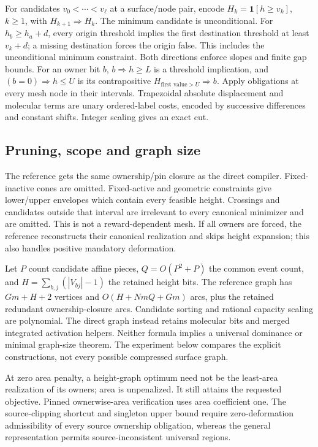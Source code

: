 \documentclass[10pt,letterpaper]{article}
\begin{document}
For candidates $v_0<\cdots<v_\ell$ at a surface/node pair, encode $H_k=\mathbf1[h\ge v_k]$, $k\ge1$, with $H_{k+1}\Rightarrow H_k$. The minimum candidate is unconditional. For $h_b\ge h_a+d$, every origin threshold implies the first destination threshold at least $v_k+d$; a missing destination forces the origin false. This includes the unconditional minimum constraint. Both directions enforce slopes and finite gap bounds. For an owner bit $b$, $b\Rightarrow h\ge L$ is a threshold implication, and $(b=0)\Rightarrow h\le U$ is its contrapositive $H_{\text{first value}>U}\Rightarrow b$. Apply obligations at every mesh node in their intervals. Trapezoidal absolute displacement and molecular terms are unary ordered-label costs, encoded by successive differences and constant shifts. Integer scaling gives an exact cut.

\subsection{Pruning, scope and graph size}
The reference gets the same ownership/pin closure as the direct compiler. Fixed-inactive cones are omitted. Fixed-active and geometric constraints give lower/upper envelopes which contain every feasible height. Crossings and candidates outside that interval are irrelevant to every canonical minimizer and are omitted. This is not a reward-dependent mesh. If all owners are forced, the reference reconstructs their canonical realization and skips height expansion; this also handles positive mandatory deformation.

Let $P$ count candidate affine pieces, $Q=O(P^2+P)$ the common event count, and $H=\sum_{b,j}(|V_{bj}|-1)$ the retained height bits. The reference graph has $Gm+H+2$ vertices and $O(H+NmQ+Gm)$ arcs, plus the retained redundant ownership-closure arcs. Candidate sorting and rational capacity scaling are polynomial. The direct graph instead retains molecular bits and merged integrated activation helpers. Neither formula implies a universal dominance or minimal graph-size theorem. The experiment below compares the explicit constructions, not every possible compressed surface graph.

At zero area penalty, a height-graph optimum need not be the least-area realization of its owners; area is unpenalized. It still attains the requested objective. Pinned ownerwise-area verification uses area coefficient one. The source-clipping shortcut and singleton upper bound require zero-deformation admissibility of every source ownership obligation, whereas the general representation permits source-inconsistent universal regions.
\end{document}
